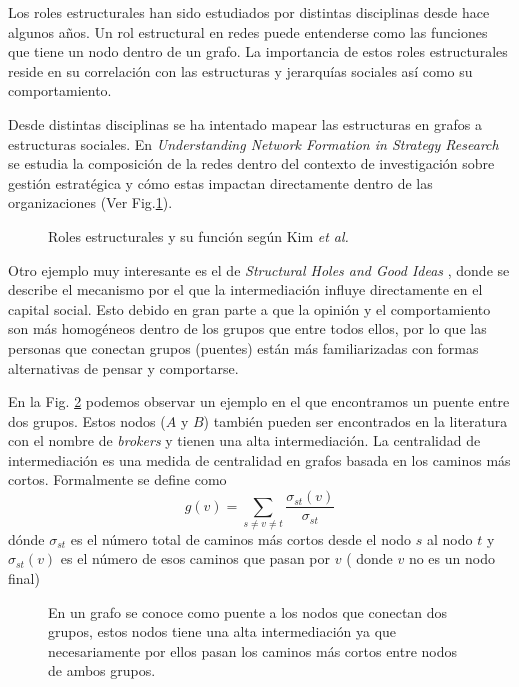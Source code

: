 Los roles estructurales han sido estudiados por distintas disciplinas desde hace algunos años. Un rol estructural en redes puede entenderse como las funciones que tiene un nodo dentro de un grafo. La importancia de estos roles estructurales reside en su correlación con las estructuras y jerarquías sociales así como su comportamiento. 

Desde distintas disciplinas se ha intentado mapear las estructuras en grafos a estructuras sociales. En \textit{Understanding Network Formation in Strategy Research} \cite{rose_kim_understanding_2016} se estudia la composición de la redes dentro del contexto de investigación sobre gestión estratégica y cómo estas impactan directamente dentro de las organizaciones (Ver Fig.\ref{fig:rosekim}).

 \begin{figure}[htbp]
   \centering
   
    \caption{Roles estructurales y su función según Kim \textit{et al.} \cite{rose_kim_understanding_2016}} %
    \label{fig:rosekim}
\end{figure}

Otro ejemplo muy interesante es el de \textit{Structural Holes and Good Ideas} \cite{burt_structural_2004}, donde se describe el mecanismo por el que la intermediación influye directamente en el capital social. Esto debido en gran parte a que la opinión y el comportamiento son más homogéneos dentro de los grupos que entre todos ellos, por lo que las personas que conectan grupos (puentes) están más familiarizadas con formas alternativas de pensar y comportarse. 

En la Fig. \ref{fig:broker} podemos observar un ejemplo en el que encontramos un puente entre dos grupos.  Estos nodos ($A$ y $B$) también pueden ser encontrados en la literatura con el nombre de \textit{brokers} y tienen una alta intermediación. La centralidad de intermediación es una medida de centralidad en grafos basada en los caminos más cortos. Formalmente se define como $$g(v)=\sum _{{s\neq v\neq t}}{\frac  {\sigma _{{st}}(v)}{\sigma _{{st}}}}$$ dónde $\sigma_{st}$ es el número total de caminos más cortos desde el nodo $s$ al nodo $t$ y
$\sigma_{st}(v)$ es el número de esos caminos que pasan por $v$ ( donde $v$ no es un nodo final)

 \begin{figure}[htbp]
   \centering
   
    \caption{En un grafo se conoce como puente a los nodos que conectan dos grupos, estos nodos tiene una alta intermediación ya que necesariamente por ellos pasan los caminos más cortos entre nodos de ambos grupos.}
    \label{fig:broker}
\end{figure}

